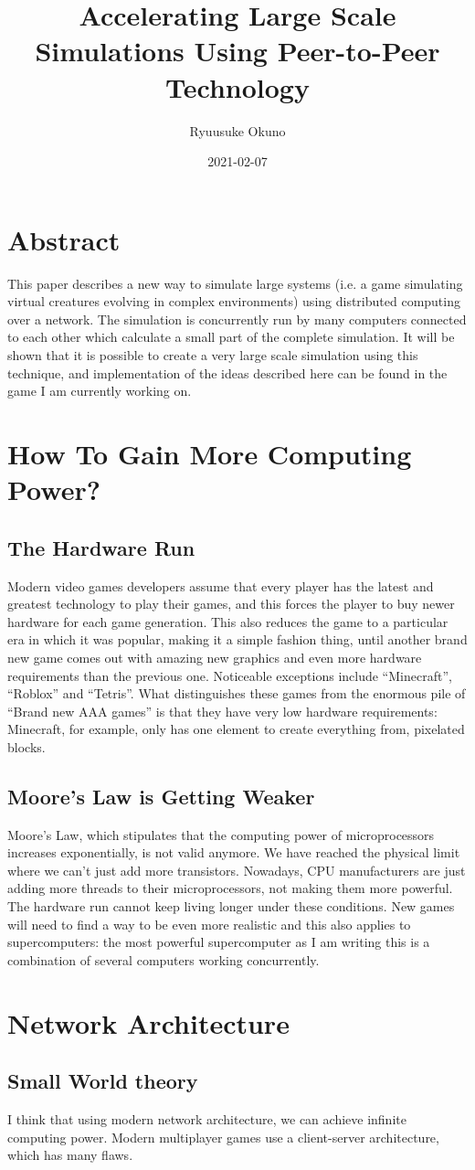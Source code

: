 \documentclass{article}
\title{Accelerating Large Scale Simulations Using Peer-to-Peer Technology}
\date{2021-02-07}
\author{Ryuusuke Okuno}
\begin{document}
\maketitle
{}
\newpage
{}

\section{Abstract}
This paper describes a new way to simulate large systems (i.e. a game
simulating virtual creatures evolving in complex environments) using
distributed computing over a network. The simulation is concurrently
run by many computers connected to each other which calculate a small
part of the complete simulation. It will be shown that it is possible
to create a very large scale simulation using this technique, and
implementation of the ideas described here can be found in the game I
am currently working on.

\section{How To Gain More Computing Power?}
\subsection{The Hardware Run}
Modern video games developers assume that every player has the latest
and greatest technology to play their games, and this forces the
player to buy newer hardware for each game generation. This also
reduces the game to a particular era in which it was popular, making
it a simple fashion thing, until another brand new game comes out with
amazing new graphics and even more hardware requirements than the
previous one. Noticeable exceptions include ``Minecraft'', ``Roblox''
and ``Tetris''. What distinguishes these games from the enormous pile
of ``Brand new AAA games'' is that they have very low hardware
requirements: Minecraft, for example, only has one element to create
everything from, pixelated blocks.

\subsection{Moore's Law is Getting Weaker}
Moore's Law, which stipulates that the computing power of
microprocessors increases exponentially, is not valid anymore. We have
reached the physical limit where we can't just add more
transistors. Nowadays, CPU manufacturers are just adding more threads
to their microprocessors, not making them more powerful. The hardware
run cannot keep living longer under these conditions. New games will
need to find a way to be even more realistic and this also applies to
supercomputers: the most powerful supercomputer as I am writing this
is a combination of several computers working concurrently.

\section{Network Architecture}
\subsection{Small World theory}
I think that using modern network architecture, we can achieve
infinite computing power. Modern multiplayer games use a
client-server architecture, which has many flaws.
\end{document}
